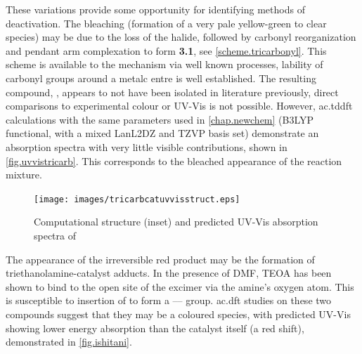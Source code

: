 These variations provide some opportunity for identifying methods of deactivation. The bleaching (formation of a very pale yellow-green to clear species) may be due to the loss of the halide, followed by carbonyl reorganization and pendant arm complexation to form \textbf{3.1}, see \autoref{scheme.tricarbonyl}. This scheme is available to the mechanism via well known processes, lability of carbonyl groups around a metalc entre is well established. The resulting compound, , appears to not have been isolated in literature previously, direct comparisons to experimental colour or UV-Vis is not possible. However, \gls{ac.tddft} calculations with the same parameters used in \autoref{chap.newchem} (B3LYP functional, with a mixed LanL2DZ and TZVP basis set) demonstrate an absorption spectra with very little visible contributions, shown in \autoref{fig.uvvistricarb}. This corresponds to the bleached appearance of the reaction mixture. 

\begin{figure}[!htbp]
 \begin{center}
  \texttt{[image: images/tricarbcatuvvisstruct.eps]}
 \end{center}
\caption[Structure and absorption spectra of proposed ]{Computational structure (inset) and predicted UV-Vis absorption spectra of }
\label{fig.uvvistricarb}
\end{figure}

The appearance of the irreversible red product may be the formation of triethanolamine-catalyst adducts\autocite{morimoto2013}. In the presence of DMF, TEOA has been shown to bind to the open site of the excimer via the amine's oxygen atom. This is susceptible to insertion of  to form a ---- group. \Gls{ac.dft} studies on these two compounds suggest that they may be a coloured species, with predicted UV-Vis showing lower energy absorption than the catalyst itself (a red shift), demonstrated in \autoref{fig.ishitani}.


